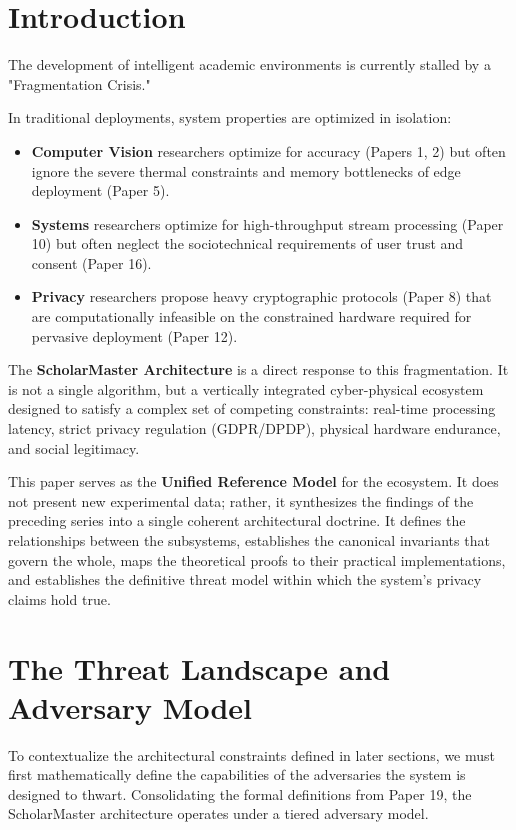 \documentclass[conference]{IEEEtran}
\theoremstyle{definition}
\begin{document}
\section{Introduction}
The development of intelligent academic environments is currently stalled by a "Fragmentation Crisis." 



In traditional deployments, system properties are optimized in isolation:
\begin{itemize}
    \item \textbf{Computer Vision} researchers optimize for accuracy (Papers 1, 2) but often ignore the severe thermal constraints and memory bottlenecks of edge deployment (Paper 5).
    \item \textbf{Systems} researchers optimize for high-throughput stream processing (Paper 10) but often neglect the sociotechnical requirements of user trust and consent (Paper 16).
    \item \textbf{Privacy} researchers propose heavy cryptographic protocols (Paper 8) that are computationally infeasible on the constrained hardware required for pervasive deployment (Paper 12).
\end{itemize}

The \textbf{ScholarMaster Architecture} is a direct response to this fragmentation. It is not a single algorithm, but a vertically integrated cyber-physical ecosystem designed to satisfy a complex set of competing constraints: real-time processing latency, strict privacy regulation (GDPR/DPDP), physical hardware endurance, and social legitimacy. 

This paper serves as the \textbf{Unified Reference Model} for the ecosystem. It does not present new experimental data; rather, it synthesizes the findings of the preceding series into a single coherent architectural doctrine. It defines the relationships between the subsystems, establishes the canonical invariants that govern the whole, maps the theoretical proofs to their practical implementations, and establishes the definitive threat model within which the system's privacy claims hold true.

\section{The Threat Landscape and Adversary Model}
To contextualize the architectural constraints defined in later sections, we must first mathematically define the capabilities of the adversaries the system is designed to thwart. Consolidating the formal definitions from Paper 19, the ScholarMaster architecture operates under a tiered adversary model. 
\end{document}
